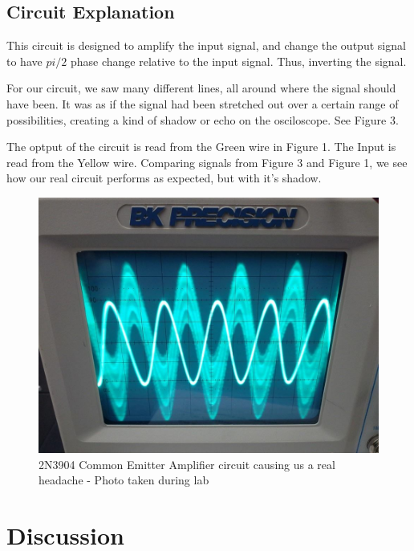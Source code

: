 \documentclass[a4paper]{article}
\begin{document}
\subsection{Circuit Explanation}

This circuit is designed to amplify the input signal, and change the output signal to have \({pi}/2\) phase change relative to the input signal. Thus, inverting the signal.

For our circuit, we saw many different lines, all around where the signal should have been.  It was as if the signal had been stretched out over a certain range of possibilities, creating a kind of shadow or echo on the osciloscope.  See Figure 3.

The optput of the circuit is read from the Green wire in Figure 1.  The Input is read from the Yellow wire.  Comparing signals from Figure 3 and Figure 1, we see how our real circuit performs as expected, but with it's shadow.

\begin{figure}
\centering
\includegraphics[width=.5\textwidth]{Weird-Signal.jpg}
\caption{\label{fig:Weird-Signal}2N3904 Common Emitter Amplifier circuit causing us a real headache - Photo taken during lab}
\end{figure}

\section{Discussion}
\end{document}
